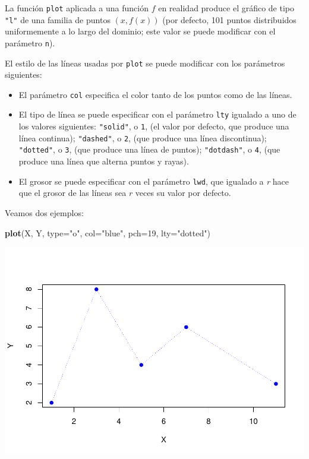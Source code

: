 \documentclass[
]{book}
\newenvironment{Shaded}{\begin{snugshade}}{\end{snugshade}}
\newcommand{\DataTypeTok}[1]{\textcolor[rgb]{0.13,0.29,0.53}{#1}}
\newcommand{\DecValTok}[1]{\textcolor[rgb]{0.00,0.00,0.81}{#1}}
\newcommand{\KeywordTok}[1]{\textcolor[rgb]{0.13,0.29,0.53}{\textbf{#1}}}
\newcommand{\NormalTok}[1]{#1}
\newcommand{\StringTok}[1]{\textcolor[rgb]{0.31,0.60,0.02}{#1}}
\theoremstyle{definition}
\theoremstyle{definition}
\theoremstyle{definition}
\theoremstyle{remark}
\begin{document}
La función \texttt{plot} aplicada a una función \(f\) en realidad produce el gráfico de tipo \texttt{"l"} de una familia de puntos \((x, f(x))\) (por defecto, 101 puntos distribuidos uniformemente a lo largo del dominio; este valor se puede modificar con el parámetro \texttt{n}).

El estilo de las líneas usadas por \texttt{plot} se puede modificar con los parámetros siguientes:

\begin{itemize}
\item
  El parámetro \texttt{col} especifica el color tanto de los puntos como de las líneas.
\item
  El tipo de línea se puede especificar con el parámetro \texttt{lty} igualado a uno de los valores siguientes: \texttt{"solid"}, o \texttt{1}, (el valor por defecto, que produce una línea continua); \texttt{"dashed"}, o \texttt{2}, (que produce una línea discontinua); \texttt{"dotted"}, o \texttt{3}, (que produce una línea de puntos); \texttt{"dotdash"}, o \texttt{4}, (que produce una línea que alterna puntos y rayas).
\item
  El grosor se puede especificar con el parámetro \texttt{lwd}, que igualado a \emph{r} hace que el grosor de las líneas sea \(r\) veces su valor por defecto.
\end{itemize}

Veamos dos ejemplos:

\begin{Shaded}
\begin{Highlighting}[]
\KeywordTok{plot}\NormalTok{(X, Y, }\DataTypeTok{type=}\StringTok{"o"}\NormalTok{, }\DataTypeTok{col=}\StringTok{"blue"}\NormalTok{, }\DataTypeTok{pch=}\DecValTok{19}\NormalTok{, }\DataTypeTok{lty=}\StringTok{"dotted"}\NormalTok{)}
\end{Highlighting}
\end{Shaded}

\begin{center}\includegraphics[width=0.9\linewidth]{07chap06_Graficos_I_files/figure-latex/unnamed-chunk-12-1} \end{center}
\end{document}
